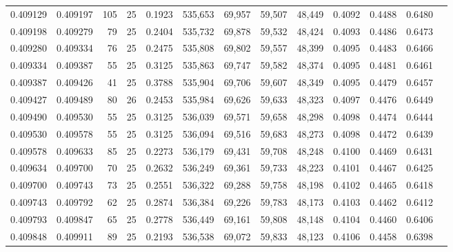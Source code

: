 \begin{tabular}{rrrrrrrrrrrrr}
0.409129 & 0.409197 &   105 &  25 &                                     0.1923 & 535,653 &  69,957 &  59,507 &  48,449 & 0.4092 & 0.4488 & 0.6480 \\
0.409198 & 0.409279 &    79 &  25 &                                     0.2404 & 535,732 &  69,878 &  59,532 &  48,424 & 0.4093 & 0.4486 & 0.6473 \\
0.409280 & 0.409334 &    76 &  25 &                                     0.2475 & 535,808 &  69,802 &  59,557 &  48,399 & 0.4095 & 0.4483 & 0.6466 \\
0.409334 & 0.409387 &    55 &  25 &                                     0.3125 & 535,863 &  69,747 &  59,582 &  48,374 & 0.4095 & 0.4481 & 0.6461 \\
0.409387 & 0.409426 &    41 &  25 &                                     0.3788 & 535,904 &  69,706 &  59,607 &  48,349 & 0.4095 & 0.4479 & 0.6457 \\
0.409427 & 0.409489 &    80 &  26 &                                     0.2453 & 535,984 &  69,626 &  59,633 &  48,323 & 0.4097 & 0.4476 & 0.6449 \\
0.409490 & 0.409530 &    55 &  25 &                                     0.3125 & 536,039 &  69,571 &  59,658 &  48,298 & 0.4098 & 0.4474 & 0.6444 \\
0.409530 & 0.409578 &    55 &  25 &                                     0.3125 & 536,094 &  69,516 &  59,683 &  48,273 & 0.4098 & 0.4472 & 0.6439 \\
0.409578 & 0.409633 &    85 &  25 &                                     0.2273 & 536,179 &  69,431 &  59,708 &  48,248 & 0.4100 & 0.4469 & 0.6431 \\
0.409634 & 0.409700 &    70 &  25 &                                     0.2632 & 536,249 &  69,361 &  59,733 &  48,223 & 0.4101 & 0.4467 & 0.6425 \\
0.409700 & 0.409743 &    73 &  25 &                                     0.2551 & 536,322 &  69,288 &  59,758 &  48,198 & 0.4102 & 0.4465 & 0.6418 \\
0.409743 & 0.409792 &    62 &  25 &                                     0.2874 & 536,384 &  69,226 &  59,783 &  48,173 & 0.4103 & 0.4462 & 0.6412 \\
0.409793 & 0.409847 &    65 &  25 &                                     0.2778 & 536,449 &  69,161 &  59,808 &  48,148 & 0.4104 & 0.4460 & 0.6406 \\
0.409848 & 0.409911 &    89 &  25 &                                     0.2193 & 536,538 &  69,072 &  59,833 &  48,123 & 0.4106 & 0.4458 & 0.6398 \\

\end{tabular}
